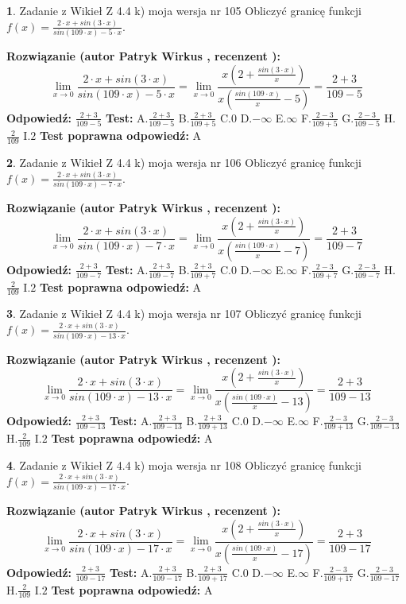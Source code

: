 \documentclass[12pt, a4paper]{article}
\theoremstyle{definition} %
\newtheorem{zad}{}
\newcommand{\zadStart}[1]{\begin{zad}#1\newline}
\newcommand{\zadStop}{\end{zad}}
\newcommand{\rozwStart}[2]{\noindent \textbf{Rozwiązanie (autor #1 , recenzent #2): }\newline}
\newcommand{\rozwStop}{\newline}
\newcommand{\odpStart}{\noindent \textbf{Odpowiedź:}\newline}
\newcommand{\odpStop}{\newline}
\newcommand{\testStart}{\noindent \textbf{Test:}\newline}
\newcommand{\testStop}{\newline}
\newcommand{\kluczStart}{\noindent \textbf{Test poprawna odpowiedź:}\newline}
\newcommand{\kluczStop}{\newline}
\begin{document}
\zadStart{Zadanie z Wikieł Z 4.4 k) moja wersja nr 105}
Obliczyć granicę funkcji $f(x)=\frac{2\cdot x +sin(3\cdot x)}{sin(109\cdot x) -5\cdot x}$.
\zadStop
\rozwStart{Patryk Wirkus}{}
$$\lim\limits_{x\to 0}\frac{2\cdot x +sin(3\cdot x)}{sin(109\cdot x) -5\cdot x}
=\lim\limits_{x\to 0}\frac{x(2+\frac{sin(3\cdot x)}{x})}{x(\frac{sin(109\cdot x)}{x}-5)}
=\frac{2+3}{109-5}$$
\rozwStop
\odpStart
$\frac{2+3}{109-5}$
\odpStop
\testStart
A.$\frac{2+3}{109-5}$
B.$\frac{2+3}{109+5}$
C.$0$
D.$-\infty$
E.$\infty$
F.$\frac{2-3}{109+5}$
G.$\frac{2-3}{109-5}$
H.$\frac{2}{109}$
I.$2$
\testStop
\kluczStart
A
\kluczStop



\zadStart{Zadanie z Wikieł Z 4.4 k) moja wersja nr 106}
Obliczyć granicę funkcji $f(x)=\frac{2\cdot x +sin(3\cdot x)}{sin(109\cdot x) -7\cdot x}$.
\zadStop
\rozwStart{Patryk Wirkus}{}
$$\lim\limits_{x\to 0}\frac{2\cdot x +sin(3\cdot x)}{sin(109\cdot x) -7\cdot x}
=\lim\limits_{x\to 0}\frac{x(2+\frac{sin(3\cdot x)}{x})}{x(\frac{sin(109\cdot x)}{x}-7)}
=\frac{2+3}{109-7}$$
\rozwStop
\odpStart
$\frac{2+3}{109-7}$
\odpStop
\testStart
A.$\frac{2+3}{109-7}$
B.$\frac{2+3}{109+7}$
C.$0$
D.$-\infty$
E.$\infty$
F.$\frac{2-3}{109+7}$
G.$\frac{2-3}{109-7}$
H.$\frac{2}{109}$
I.$2$
\testStop
\kluczStart
A
\kluczStop



\zadStart{Zadanie z Wikieł Z 4.4 k) moja wersja nr 107}
Obliczyć granicę funkcji $f(x)=\frac{2\cdot x +sin(3\cdot x)}{sin(109\cdot x) -13\cdot x}$.
\zadStop
\rozwStart{Patryk Wirkus}{}
$$\lim\limits_{x\to 0}\frac{2\cdot x +sin(3\cdot x)}{sin(109\cdot x) -13\cdot x}
=\lim\limits_{x\to 0}\frac{x(2+\frac{sin(3\cdot x)}{x})}{x(\frac{sin(109\cdot x)}{x}-13)}
=\frac{2+3}{109-13}$$
\rozwStop
\odpStart
$\frac{2+3}{109-13}$
\odpStop
\testStart
A.$\frac{2+3}{109-13}$
B.$\frac{2+3}{109+13}$
C.$0$
D.$-\infty$
E.$\infty$
F.$\frac{2-3}{109+13}$
G.$\frac{2-3}{109-13}$
H.$\frac{2}{109}$
I.$2$
\testStop
\kluczStart
A
\kluczStop



\zadStart{Zadanie z Wikieł Z 4.4 k) moja wersja nr 108}
Obliczyć granicę funkcji $f(x)=\frac{2\cdot x +sin(3\cdot x)}{sin(109\cdot x) -17\cdot x}$.
\zadStop
\rozwStart{Patryk Wirkus}{}
$$\lim\limits_{x\to 0}\frac{2\cdot x +sin(3\cdot x)}{sin(109\cdot x) -17\cdot x}
=\lim\limits_{x\to 0}\frac{x(2+\frac{sin(3\cdot x)}{x})}{x(\frac{sin(109\cdot x)}{x}-17)}
=\frac{2+3}{109-17}$$
\rozwStop
\odpStart
$\frac{2+3}{109-17}$
\odpStop
\testStart
A.$\frac{2+3}{109-17}$
B.$\frac{2+3}{109+17}$
C.$0$
D.$-\infty$
E.$\infty$
F.$\frac{2-3}{109+17}$
G.$\frac{2-3}{109-17}$
H.$\frac{2}{109}$
I.$2$
\testStop
\kluczStart
A
\kluczStop
\end{document}
